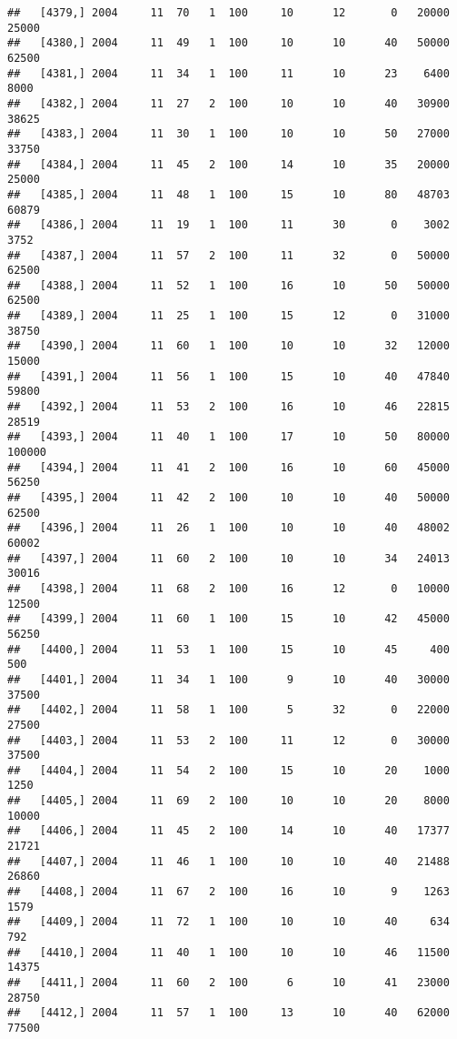 \documentclass{article}\usepackage[]{graphicx}\usepackage[]{color}
\makeatletter
\newenvironment{kframe}{%
 \def\at@end@of@kframe{}%
 \ifinner\ifhmode%
  \def\at@end@of@kframe{\end{minipage}}%
  \begin{minipage}{\columnwidth}%
 \fi\fi%
 \def\FrameCommand##1{\hskip\@totalleftmargin \hskip-\fboxsep
 \colorbox{shadecolor}{##1}\hskip-\fboxsep
     \hskip-\linewidth \hskip-\@totalleftmargin \hskip\columnwidth}%
 \MakeFramed {\advance\hsize-\width
   \@totalleftmargin\z@ \linewidth\hsize
   \@setminipage}}%
 {\par\unskip\endMakeFramed%
 \at@end@of@kframe}
\newenvironment{knitrout}{}{} %
\makeatother
\begin{document}
\begin{knitrout}
\begin{kframe}
\begin{verbatim}
##   [4379,] 2004     11  70   1  100     10      12       0   20000   25000
##   [4380,] 2004     11  49   1  100     10      10      40   50000   62500
##   [4381,] 2004     11  34   1  100     11      10      23    6400    8000
##   [4382,] 2004     11  27   2  100     10      10      40   30900   38625
##   [4383,] 2004     11  30   1  100     10      10      50   27000   33750
##   [4384,] 2004     11  45   2  100     14      10      35   20000   25000
##   [4385,] 2004     11  48   1  100     15      10      80   48703   60879
##   [4386,] 2004     11  19   1  100     11      30       0    3002    3752
##   [4387,] 2004     11  57   2  100     11      32       0   50000   62500
##   [4388,] 2004     11  52   1  100     16      10      50   50000   62500
##   [4389,] 2004     11  25   1  100     15      12       0   31000   38750
##   [4390,] 2004     11  60   1  100     10      10      32   12000   15000
##   [4391,] 2004     11  56   1  100     15      10      40   47840   59800
##   [4392,] 2004     11  53   2  100     16      10      46   22815   28519
##   [4393,] 2004     11  40   1  100     17      10      50   80000  100000
##   [4394,] 2004     11  41   2  100     16      10      60   45000   56250
##   [4395,] 2004     11  42   2  100     10      10      40   50000   62500
##   [4396,] 2004     11  26   1  100     10      10      40   48002   60002
##   [4397,] 2004     11  60   2  100     10      10      34   24013   30016
##   [4398,] 2004     11  68   2  100     16      12       0   10000   12500
##   [4399,] 2004     11  60   1  100     15      10      42   45000   56250
##   [4400,] 2004     11  53   1  100     15      10      45     400     500
##   [4401,] 2004     11  34   1  100      9      10      40   30000   37500
##   [4402,] 2004     11  58   1  100      5      32       0   22000   27500
##   [4403,] 2004     11  53   2  100     11      12       0   30000   37500
##   [4404,] 2004     11  54   2  100     15      10      20    1000    1250
##   [4405,] 2004     11  69   2  100     10      10      20    8000   10000
##   [4406,] 2004     11  45   2  100     14      10      40   17377   21721
##   [4407,] 2004     11  46   1  100     10      10      40   21488   26860
##   [4408,] 2004     11  67   2  100     16      10       9    1263    1579
##   [4409,] 2004     11  72   1  100     10      10      40     634     792
##   [4410,] 2004     11  40   1  100     10      10      46   11500   14375
##   [4411,] 2004     11  60   2  100      6      10      41   23000   28750
##   [4412,] 2004     11  57   1  100     13      10      40   62000   77500

\end{verbatim}
\end{kframe}
\end{knitrout}
\end{document}
